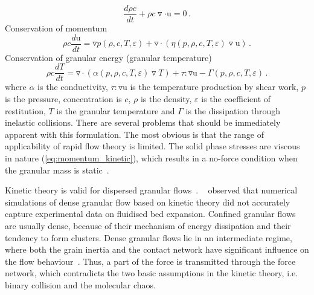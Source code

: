 \begin{equation}
\frac{d \rho c}{dt} + \rho c \triangledown \cdot \mathrm{u} = 0 \,.
\end{equation}
\noindent Conservation of momentum
\begin{equation}
\label{eq:momentum_kinetic}
\rho c \frac{d \mathrm{u}}{dt} = \triangledown p(\rho,c,T,\varepsilon) + 
\triangledown \cdot ( \eta (p,\rho,c,T,\varepsilon)  \triangledown \mathrm{u}) 
\,.
\end{equation}
\noindent Conservation of granular energy (granular temperature)
\begin{equation}
\rho c \frac{d T}{dt} = \triangledown \cdot ( \alpha (p,\rho, c, 
T,\varepsilon)  
\triangledown T) + \tau : \triangledown \mathrm{u} - \Gamma 
(p,\rho,c,T,\varepsilon)  \,.
\end{equation}
where $\alpha$ is the conductivity, $\tau : \triangledown \mathrm{u}$ is the 
temperature production by shear work, $p$ is the pressure, concentration is 
$c$, $\rho$ is the density, $\varepsilon$ is the coefficient of restitution, 
$T$ is the granular temperature and $\Gamma$ is the dissipation through 
inelastic collisions. There are several problems that should be immediately
apparent with this formulation. The most obvious is that the
range of applicability of rapid flow theory is limited. The solid phase 
stresses are viscous in nature (\cref{eq:momentum_kinetic}), which results in 
a no-force condition when the granular mass is static~\citep{Campbell2006}.

Kinetic theory is valid for dispersed granular flows~\citep{Ng2008}.
~\citet{VanWachem2001} observed that numerical simulations of dense 
granular flow based on kinetic theory did not accurately capture
experimental data on fluidised bed expansion. Confined granular flows are 
usually dense, because of their mechanism of energy dissipation and their 
tendency to form clusters. Dense granular flows lie in an intermediate 
regime, where both the grain inertia and the contact network have significant 
influence on the flow behaviour~\citep{Pouliquen2002}. Thus, a part of the 
force is transmitted through the force network, which contradicts the two basic 
assumptions in the kinetic theory, i.e. binary collision and the molecular 
chaos. 

